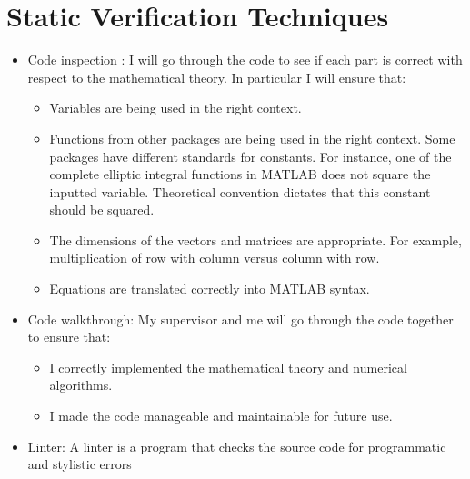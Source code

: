 \documentclass[12pt, titlepage]{article}
\begin{document}
\section{Static Verification Techniques}
\label{staticVertech}
\begin{itemize}
	\item Code inspection : I will 
	go through the code to see if each part is correct with respect to the
	mathematical theory. In particular I will ensure that: 
	\begin{itemize}
		\item Variables are being used in the right context. 
		\item Functions from other packages are being used in the right 
		context. Some packages have different standards for 
		constants. For instance, one of the complete elliptic integral 
		functions in MATLAB does not square the inputted variable. Theoretical 
		convention dictates that this constant should be squared. 
		\item The dimensions of the vectors and matrices are appropriate. For 
		example, multiplication of row with column versus column with row.
		\item Equations are translated correctly into MATLAB syntax.  
	\end{itemize} 
	\item Code walkthrough: My supervisor and me will go through the code 
	together to ensure that: 
	\begin{itemize}
		\item I correctly implemented the mathematical theory and numerical 
		algorithms.
		\item I made the code manageable and maintainable for future use.
	\end{itemize} 

	\item Linter: A linter is a program that checks the source code for 
	programmatic and stylistic errors
\end{itemize}

\end{document}
